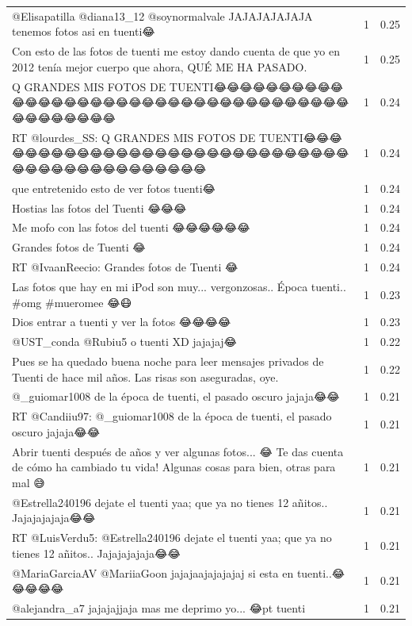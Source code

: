 \begin{longtable}{p{12.5cm}rr}
\bottomrule
\endlastfoot
@Elisapatilla @diana13\_12 @soynormalvale JAJAJAJAJAJA tenemos fotos asi en tuenti😂 & 1 & 0.25 \\
Con esto de las fotos de tuenti me estoy dando cuenta de que yo en 2012 tenía mejor cuerpo que ahora, QUÉ ME HA PASADO. & 1 & 0.25 \\
Q GRANDES MIS FOTOS DE TUENTI😂😂😂😂😂😂😂😂😂😂😂😂😂😂😂😂😂😂😂😂😂😂😂😂😂😂😂😂😂😂😂😂😂😂😂😂😂😂😂😂😂😂😂😂 & 1 & 0.24 \\
RT @lourdes\_SS: Q GRANDES MIS FOTOS DE TUENTI😂😂😂😂😂😂😂😂😂😂😂😂😂😂😂😂😂😂😂😂😂😂😂😂😂😂😂😂😂😂😂😂😂😂😂😂😂😂😂😂😂😂😂😂 & 1 & 0.24 \\
que entretenido esto de ver fotos tuenti😂 & 1 & 0.24 \\
Hostias las fotos del Tuenti 😂😂😂 & 1 & 0.24 \\
Me mofo con las fotos del tuenti 😂😂😂😂😂😂 & 1 & 0.24 \\
Grandes fotos de Tuenti 😂👏👏 & 1 & 0.24 \\
RT @IvaanReecio: Grandes fotos de Tuenti 😂👏👏 & 1 & 0.24 \\
Las fotos que hay en mi iPod son muy... vergonzosas.. Época tuenti.. \#omg \#mueromee 😂😷 & 1 & 0.23 \\
Dios entrar a tuenti y ver la fotos 😂😂😂😂 & 1 & 0.23 \\
@UST\_conda @Rubiu5 o tuenti XD jajajaj😂 & 1 & 0.22 \\
Pues se ha quedado buena noche para leer mensajes privados de Tuenti de hace mil años. Las risas son aseguradas, oye. & 1 & 0.22 \\
@\_guiomar1008 de la época de tuenti, el pasado oscuro jajaja😂😂 & 1 & 0.21 \\
RT @Candiiu97: @\_guiomar1008 de la época de tuenti, el pasado oscuro jajaja😂😂 & 1 & 0.21 \\
Abrir tuenti después de años y ver algunas fotos... 😂 Te das cuenta de cómo ha cambiado tu vida! Algunas cosas para bien, otras para mal 😅 & 1 & 0.21 \\
@Estrella240196 dejate el tuenti yaa; que ya no tienes 12 añitos.. Jajajajajaja😂😂 & 1 & 0.21 \\
RT @LuisVerdu5: @Estrella240196 dejate el tuenti yaa; que ya no tienes 12 añitos.. Jajajajajaja😂😂 & 1 & 0.21 \\
@MariaGarciaAV @MariiaGoon  jajajaajajajajaj si esta en tuenti..😂😂😂😂😂 & 1 & 0.21 \\
@alejandra\_a7  jajajajjaja mas me deprimo yo... 😂pt tuenti & 1 & 0.21 \\

\end{longtable}

